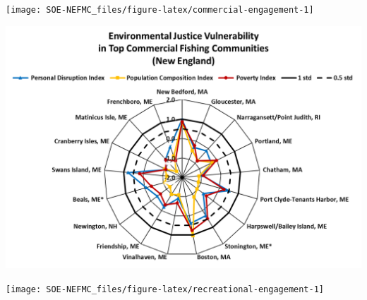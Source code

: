 \documentclass[
  10pt,
]{article}
\let\origfigure\figure
\let\endorigfigure\endfigure
\renewenvironment{figure}[1][2] {
    \expandafter\origfigure\expandafter[H]
} {
    \endorigfigure
}
\begin{document}
\begin{figure}

{\centering \texttt{[image: SOE-NEFMC\_files/figure-latex/commercial-engagement-1]} 

}

\caption{Commercial engagement, reliance, and environmental justice vulnerability for the top commercially engaged and reliant fishing communities in New England. Communities in orange are ranked medium-high or above for one or more of the environmental justice indicators. Communities in purple are ranked medium for one or more of the environmental justice indicators. *Community scored high (1.00 and above) for both commercial engagement and reliance indicators.}\label{fig:commercial-engagement}
\end{figure}
\begin{figure}

{\centering \includegraphics[width=0.7\linewidth]{SOE-NEFMC_files/figure-latex/commercial-EJ-1} 

}

\caption{Environmental justice indicators (Poverty Index, population composition index, and personal disruption index) for top commercial fishing communities in New England. *Community scored high (1.00 and above) for both commercial engagement and reliance indicators.}\label{fig:commercial-EJ}
\end{figure}
\begin{figure}

{\centering \texttt{[image: SOE-NEFMC\_files/figure-latex/recreational-engagement-1]} 

}

\caption{Recreational engagement and reliance, and environmental justice vulnerability, for the top recreationally engaged and reliant fishing communities in New England. None of these communities ranked medium-high or above for one or more of the environmental justice indicators. Communities ranked medium for one or more of the environmental justice indicators are highlighted in purple. *Community scored high (1.00 and above) for both recreational engagement and reliance indicators.}\label{fig:recreational-engagement}
\end{figure}
\end{document}

